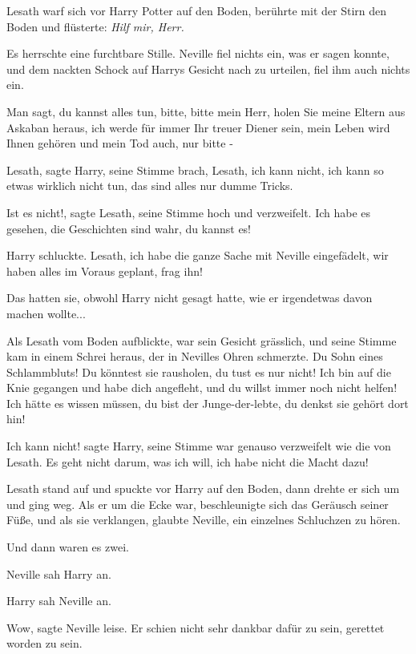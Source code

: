 Lesath warf sich vor Harry Potter auf den Boden, berührte mit der Stirn den
Boden und flüsterte: \emph{\glqq{}Hilf mir, Herr.\grqq{}}

Es herrschte eine furchtbare Stille. Neville fiel nichts ein, was er sagen
konnte, und dem nackten Schock auf Harrys Gesicht nach zu urteilen, fiel ihm
auch nichts ein.

\glqq{}Man sagt, du kannst alles tun, bitte, bitte mein Herr, holen Sie meine
Eltern aus Askaban heraus, ich werde für immer Ihr treuer Diener sein, mein
Leben wird Ihnen gehören und mein Tod auch, nur bitte -\grqq{}

\glqq{}Lesath\grqq{}, sagte Harry, seine Stimme brach, \glqq{}Lesath, ich kann
nicht, ich kann so etwas wirklich nicht tun, das sind alles nur dumme
Tricks.\grqq{}

\glqq{}Ist es nicht!\grqq{}, sagte Lesath, seine Stimme hoch und verzweifelt.
\glqq{}Ich habe es gesehen, die Geschichten sind wahr, du kannst es!\grqq{}

Harry schluckte. \glqq{}Lesath, ich habe die ganze Sache mit Neville
eingefädelt, wir haben alles im Voraus geplant, frag ihn!\grqq{}

Das hatten sie, obwohl Harry nicht gesagt hatte, wie er irgendetwas davon machen
wollte...

Als Lesath vom Boden aufblickte, war sein Gesicht grässlich, und seine Stimme
kam in einem Schrei heraus, der in Nevilles Ohren schmerzte. \glqq{}Du Sohn
eines Schlammbluts! Du könntest sie rausholen, du tust es nur nicht! Ich bin auf
die Knie gegangen und habe dich angefleht, und du willst immer noch nicht
helfen! Ich hätte es wissen müssen, du bist der Junge-der-lebte, du denkst sie
gehört dort hin!\grqq{}

\glqq{}Ich kann nicht!\grqq{} sagte Harry, seine Stimme war genauso verzweifelt
wie die von Lesath. \glqq{}Es geht nicht darum, was ich will, ich habe nicht die
Macht dazu!\grqq{}

Lesath stand auf und spuckte vor Harry auf den Boden, dann drehte er sich um und
ging weg. Als er um die Ecke war, beschleunigte sich das Geräusch seiner Füße,
und als sie verklangen, glaubte Neville, ein einzelnes Schluchzen zu hören.

Und dann waren es zwei.

Neville sah Harry an.

Harry sah Neville an.

\glqq{}Wow\grqq{}, sagte Neville leise. \glqq{}Er schien nicht sehr dankbar
dafür zu sein, gerettet worden zu sein.\grqq{}

